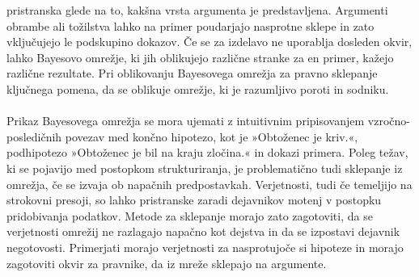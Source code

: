 \documentclass[12pt,a4paper]{amsart}
\theoremstyle{definition} %
\theoremstyle{plain} %
\begin{document}
pristranska glede na to, kakšna vrsta argumenta je predstavljena. Argumenti obrambe ali tožilstva lahko na primer poudarjajo nasprotne sklepe
in zato vključujejo le podskupino dokazov. Če se za izdelavo ne uporablja dosleden okvir, lahko Bayesovo omrežje, ki jih oblikujejo različne stranke za en
primer, kažejo različne rezultate. Pri oblikovanju Bayesovega omrežja za pravno sklepanje ključnega pomena, da se oblikuje omrežje, ki je razumljivo poroti
in sodniku.\\\\
Prikaz Bayesovega omrežja se mora ujemati z intuitivnim pripisovanjem vzročno-posledičnih povezav med končno hipotezo, kot je »Obtoženec je kriv.«, podhipotezo
»Obtoženec je bil na kraju zločina.« in dokazi primera. Poleg težav, ki se pojavijo med postopkom strukturiranja, je problematično tudi sklepanje
iz omrežja, če se izvaja ob napačnih predpostavkah. Verjetnosti, tudi če temeljijo na strokovni presoji, so lahko pristranske zaradi dejavnikov
motenj v postopku pridobivanja podatkov. Metode za sklepanje morajo zato zagotoviti, da se verjetnosti omrežij ne razlagajo napačno kot dejstva in
da se izpostavi dejavnik negotovosti. Primerjati morajo verjetnosti za nasprotujoče si hipoteze in morajo zagotoviti okvir za pravnike, da iz
mreže sklepajo na argumente.

\end{document}
